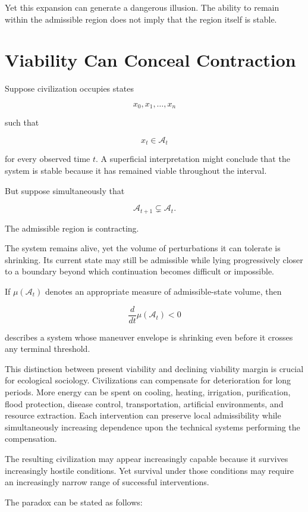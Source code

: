 \documentclass[11pt,oneside]{book}
\theoremstyle{definition}
\theoremstyle{remark}
\newcommand{\A}{\mathcal{A}}
\begin{document}
Yet this expansion can generate a dangerous illusion. The ability to remain within the admissible region does not imply that the region itself is stable.

\section{Viability Can Conceal Contraction}

Suppose civilization occupies states

\[
x_0,x_1,\ldots,x_n
\]

such that

\[
x_t\in\A_t
\]

for every observed time \(t\). A superficial interpretation might conclude that the system is stable because it has remained viable throughout the interval.

But suppose simultaneously that

\[
\A_{t+1}\subsetneq\A_t.
\]

The admissible region is contracting.

The system remains alive, yet the volume of perturbations it can tolerate is shrinking. Its current state may still be admissible while lying progressively closer to a boundary beyond which continuation becomes difficult or impossible.

If \(\mu(\A_t)\) denotes an appropriate measure of admissible-state volume, then

\[
\frac{d}{dt}\mu(\A_t)<0
\]

describes a system whose maneuver envelope is shrinking even before it crosses any terminal threshold.

This distinction between present viability and declining viability margin is crucial for ecological sociology. Civilizations can compensate for deterioration for long periods. More energy can be spent on cooling, heating, irrigation, purification, flood protection, disease control, transportation, artificial environments, and resource extraction. Each intervention can preserve local admissibility while simultaneously increasing dependence upon the technical systems performing the compensation.

The resulting civilization may appear increasingly capable because it survives increasingly hostile conditions. Yet survival under those conditions may require an increasingly narrow range of successful interventions.

The paradox can be stated as follows:
\end{document}
